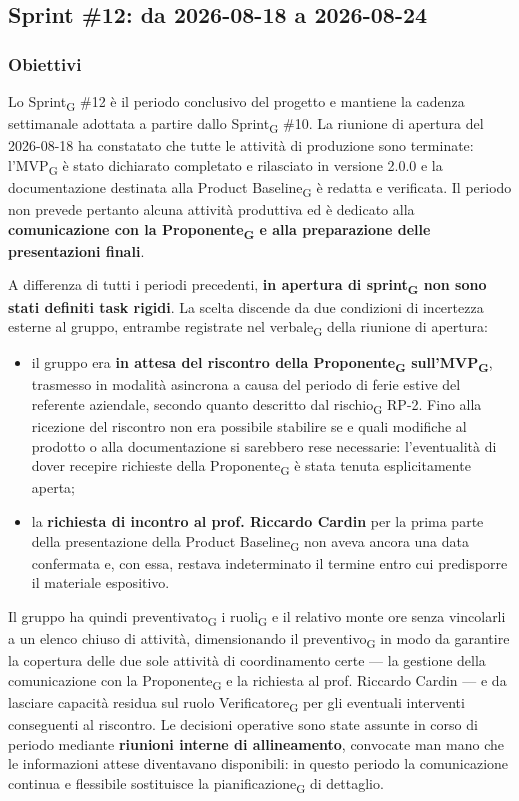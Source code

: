 ﻿\documentclass[a4paper, 10pt, colorlinks=true, linkcolor=black, urlcolor=blue, citecolor=blue, hidelinks]{article}
\begin{document}
\subsection{Sprint \#12: da 2026-08-18 a 2026-08-24}

\subsubsection{Obiettivi}
Lo Sprint\textsubscript{G} \#12 è il periodo conclusivo del progetto e mantiene la cadenza settimanale adottata a partire dallo Sprint\textsubscript{G} \#10. La riunione di apertura del 2026-08-18 ha constatato che tutte le attività di produzione sono terminate: l'MVP\textsubscript{G} è stato dichiarato completato e rilasciato in versione 2.0.0 e la documentazione destinata alla Product Baseline\textsubscript{G} è redatta e verificata. Il periodo non prevede pertanto alcuna attività produttiva ed è dedicato alla \textbf{comunicazione con la Proponente\textsubscript{G} e alla preparazione delle presentazioni finali}.

A differenza di tutti i periodi precedenti, \textbf{in apertura di sprint\textsubscript{G} non sono stati definiti task rigidi}. La scelta discende da due condizioni di incertezza esterne al gruppo, entrambe registrate nel verbale\textsubscript{G} della riunione di apertura:
\begin{itemize}
    \item il gruppo era \textbf{in attesa del riscontro della Proponente\textsubscript{G} sull'MVP\textsubscript{G}}, trasmesso in modalità asincrona a causa del periodo di ferie estive del referente aziendale, secondo quanto descritto dal rischio\textsubscript{G} RP-2. Fino alla ricezione del riscontro non era possibile stabilire se e quali modifiche al prodotto o alla documentazione si sarebbero rese necessarie: l'eventualità di dover recepire richieste della Proponente\textsubscript{G} è stata tenuta esplicitamente aperta;

    \item la \textbf{richiesta di incontro al prof. Riccardo Cardin} per la prima parte della presentazione della Product Baseline\textsubscript{G} non aveva ancora una data confermata e, con essa, restava indeterminato il termine entro cui predisporre il materiale espositivo.
\end{itemize}

Il gruppo ha quindi preventivato\textsubscript{G} i ruoli\textsubscript{G} e il relativo monte ore senza vincolarli a un elenco chiuso di attività, dimensionando il preventivo\textsubscript{G} in modo da garantire la copertura delle due sole attività di coordinamento certe --- la gestione della comunicazione con la Proponente\textsubscript{G} e la richiesta al prof. Riccardo Cardin --- e da lasciare capacità residua sul ruolo Verificatore\textsubscript{G} per gli eventuali interventi conseguenti al riscontro. Le decisioni operative sono state assunte in corso di periodo mediante \textbf{riunioni interne di allineamento}, convocate man mano che le informazioni attese diventavano disponibili: in questo periodo la comunicazione continua e flessibile sostituisce la pianificazione\textsubscript{G} di dettaglio.
\end{document}
